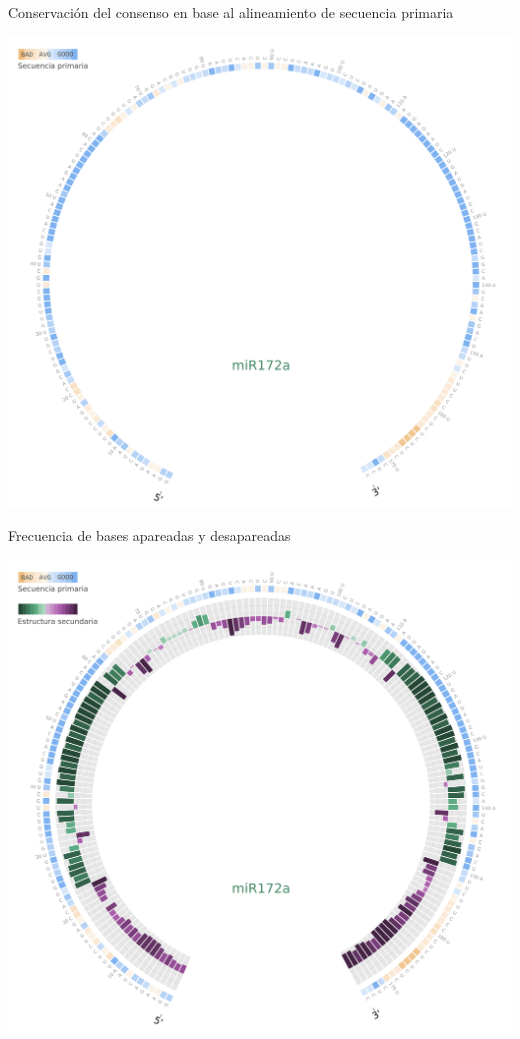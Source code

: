 \documentclass{beamer}
\begin{document}
\begin{frame}{Conservación del consenso en base al alineamiento de secuencia primaria}
	\begin{center}
		\includegraphics[width=.8\textwidth]{img/miR172a_circos01.png}
	\end{center}
\end{frame}

\begin{frame}{Frecuencia de bases apareadas y desapareadas}
	\begin{center}
		\includegraphics[width=.8\textwidth]{img/miR172a_circos02.png}
	\end{center}
\end{frame}
\end{document}

